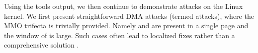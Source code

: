



Using the tools output, we then continue to demonstrate attacks on the Linux kernel.
%
We first present straightforward DMA attacks (termed \simple attacks), where the MMO trifecta is trivially provided. Namely \means and \motivation are present in a single page and the window of \oportunity is large. Such cases often lead to localized fixes rather than a comprehensive solution \cite{thunder}.

